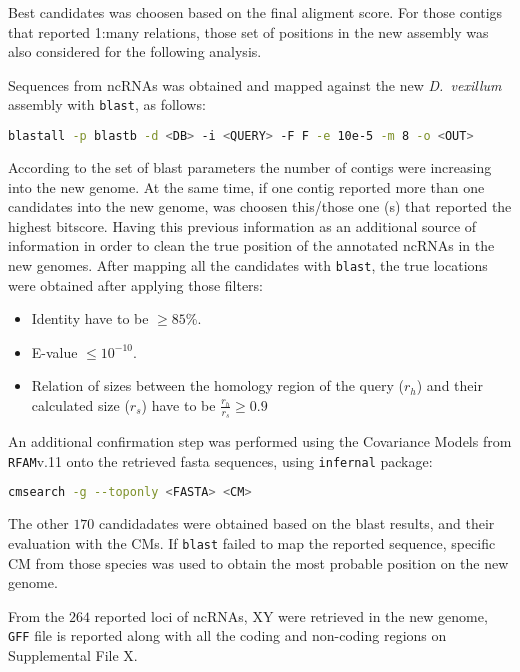\documentclass[11pt]{article}
\begin{document}
Best candidates was choosen based on the final aligment score. For those
contigs that reported 1:many relations, those set of positions in the new
assembly was also considered for the following analysis.

Sequences from ncRNAs was obtained and mapped against the new \textit{D.\
vexillum} assembly with \texttt{blast}, as follows:

\begin{lstlisting}[language=bash, breaklines=true]
blastall -p blastb -d <DB> -i <QUERY> -F F -e 10e-5 -m 8 -o <OUT>
\end{lstlisting}

According to the set of blast parameters the number of contigs were increasing
into the new genome. At the same time, if one contig reported more than one
candidates into the new genome, was choosen this/those one (s) that reported the 
highest bitscore. Having this previous information as an additional source of 
information in order to clean the true position of the annotated ncRNAs in the
new genomes. After mapping all the candidates with \texttt{blast}, the true locations
were obtained after applying those filters:
\begin{itemize}
 \item Identity have to be $\geq 85$\%.
 \item E-value $\leq 10^{-10}$.
 \item Relation of sizes between the homology region of the query
  ($r_h$) and their calculated size ($r_s$) have to be $\frac{r_h}{r_s} \geq 0.9$
\end{itemize}

An additional confirmation step was performed using the Covariance Models from
\texttt{RFAM}v.11 onto the retrieved fasta sequences, using \texttt{infernal} package:
\begin{lstlisting}[language=bash, breaklines=true]
cmsearch -g --toponly <FASTA> <CM>
\end{lstlisting}

The other $170$ candidadates were obtained based on the blast results, and 
their evaluation with the CMs. If \texttt{blast} failed to map the reported
sequence, specific CM from those species was used to obtain the most probable
position on the new genome.

From the $264$ reported loci of ncRNAs, XY were retrieved in the
new genome, \texttt{GFF} file is reported along with all the coding and non-coding
regions on Supplemental File X.
\end{document}

